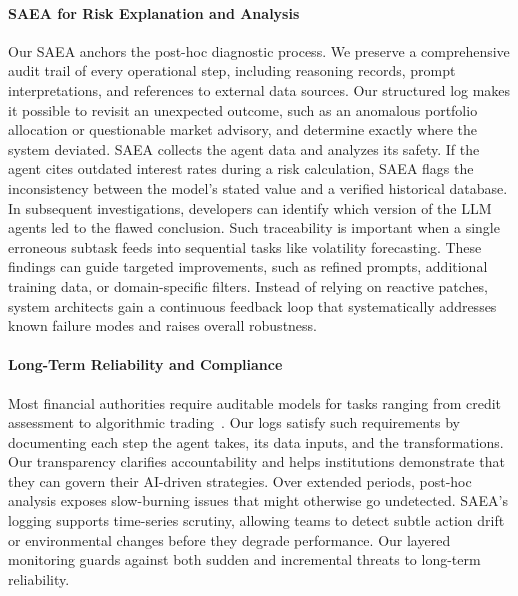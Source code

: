 \paragraph{SAEA for Risk Explanation and Analysis}
Our SAEA anchors the post-hoc diagnostic process. We preserve a comprehensive audit trail of every operational step, including reasoning records, prompt interpretations, and references to external data sources. Our structured log makes it possible to revisit an unexpected outcome, such as an anomalous portfolio allocation or questionable market advisory, and determine exactly where the system deviated.
SAEA collects the agent data and analyzes its safety. If the agent cites outdated interest rates during a risk calculation, SAEA flags the inconsistency between the model's stated value and a verified historical database. In subsequent investigations, developers can identify which version of the LLM agents led to the flawed conclusion. Such traceability is important when a single erroneous subtask feeds into sequential tasks like volatility forecasting. These findings can guide targeted improvements, such as refined prompts, additional training data, or domain-specific filters. Instead of relying on reactive patches, system architects gain a continuous feedback loop that systematically addresses known failure modes and raises overall robustness.

\paragraph{Long-Term Reliability and Compliance}

Most financial authorities require auditable models for tasks ranging from credit assessment to algorithmic trading~\citep{}. Our logs satisfy such requirements by documenting each step the agent takes, its data inputs, and the transformations. Our transparency clarifies accountability and helps institutions demonstrate that they can govern their AI-driven strategies.
Over extended periods, post-hoc analysis exposes slow-burning issues that might otherwise go undetected. SAEA's logging supports time-series scrutiny, allowing teams to detect subtle action drift or environmental changes before they degrade performance. Our layered monitoring guards against both sudden and incremental threats to long-term reliability.


